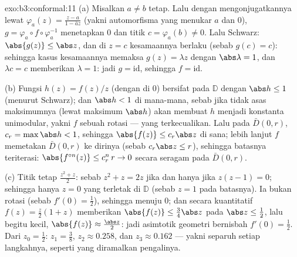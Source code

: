 \begin{solution}{exo:b3:conformal:11}
(a) Misalkan $a \neq b$ tetap. Lalu dengan mengonjugatkannya lewat $\varphi_a(z) =
\frac{z - a}{1 - \bar az}$ (yakni automorfisma yang menukar $a$
dan $0$), $g = \varphi_a\circ f\circ\varphi_a^{-1}$ menetapkan
$0$ dan titik $c = \varphi_a(b) \neq 0$. Lalu Schwarz:
$\abs{g(z)} \leq \abs z$, dan di $z = c$ kesamaannya berlaku
(sebab $g(c) = c$): sehingga kasus kesamaannya memaksa $g(z) = \lambda z$
dengan $\abs\lambda = 1$, dan $\lambda c = c$ memberikan $\lambda =
1$: jadi $g = \mathrm{id}$, sehingga $f = \mathrm{id}$.

(b) Fungsi $h(z) = f(z)/z$ (dengan  di $0$) bersifat
 pada $\mathbb D$ dengan $\abs h \leq 1$ (menurut Schwarz);
dan $\abs h < 1$ di mana-mana, sebab jika tidak asas maksimumnya
(lewat maksimum  $\abs h$) akan membuat $h$ menjadi konstanta
unimodular, yakni $f$ sebuah rotasi --- yang terkecualikan. Lalu pada 
$\bar D(0,r)$, $c_r = \max\abs h < 1$, sehingga $\abs{f(z)} \leq
c_r\abs z$ di sana; lebih lanjut $f$ memetakan $\bar D(0,r)$ ke
dirinya (sebab $c_r\abs z \leq r$), sehingga batasnya teriterasi:
$\abs{f^{\circ n}(z)} \leq c_r^n\,r \to 0$ secara seragam pada
$\bar D(0, r)$.

(c) Titik tetap $\frac{z^2 + z}2$: sebab $z^2 + z = 2z$ jika dan hanya jika
$z(z - 1) = 0$; sehingga hanya $z = 0$ yang terletak di $\mathbb D$ (sebab $z = 1$
pada batasnya). Ia bukan rotasi (sebab $f'(0) = \frac12$), sehingga
 menuju $0$; dan secara kuantitatif $f(z) = \frac z2(1 + z)$
memberikan $\abs{f(z)} \leq \frac{3}{4}\abs z$ pada $\abs z \leq
\frac12$, lalu begitu  kecil, $\abs{f(z)} \approx
\frac{\abs z}2$: jadi asimtotik geometri bernisbah
$f'(0) = \frac12$. Dari $z_0 = \frac12$: $z_1 = \frac38$,
$z_2 \approx 0.258$, dan $z_3 \approx 0.162$ --- yakni separuh setiap
langkahnya, seperti yang diramalkan pengalinya.
\end{solution}

